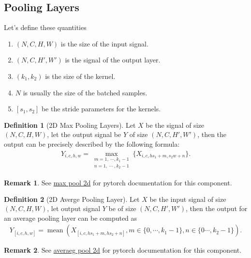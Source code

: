 \documentclass[]{article}
\theoremstyle{definition}
\newtheorem{definition}{Definition}
\newtheorem{remark}{Remark}[subsection]
{
    \newtheorem{assumption}{Assumption}
}
\numberwithin{equation}{subsection}
\begin{document}
    \subsection{Pooling Layers}
        Let's define these quantities 
        \begin{enumerate}
            \item $(N, C, H, W)$ is the size of the input signal. 
            \item $(N, C, H', W')$ is the signal of the output layer.
            \item $(k_1, k_2)$ is the size of the kernel. 
            \item $N$ is usually the size of the batched samples. 
            \item $[s_1, s_2]$ be the stride parameters for the kernels. 
        \end{enumerate}
            
        \begin{definition}[2D Max Pooling Layers]
            Let $X$ be the signal of size $(N,C, H, W)$, let the output signal be $Y$ of size $(N, C, H', W')$, then the output can be precisely described by the following formula: 
            {
            \large
            \[
                \begin{aligned}
                    Y_{i,c, h, w} = 
                    \max_{
                        \substack{m = 1, \;\cdots, k_1 - 1\\n = 1, \; \cdots \; , k_2-1}
                    }
                    \{
                        X_{i, c, hs_1 + m, s_2w + n}
                    \}. 
                \end{aligned} 
            \]
            }
        \end{definition}
        \begin{remark}
            See \href{https://pytorch.org/docs/stable/generated/torch.nn.MaxPool2d.html}{max pool 2d} for pytorch documentation for this component. 
        \end{remark}

        \begin{definition}[2D Averge Pooling Layer]
            Let $X$ be the input signal of size $(N, C, H, W)$, let output signal $Y$ be of size $(N, C, H', W')$, then the output for an average pooling layer can be computed as
            {\large
            \begin{align*}
                Y_{[i, c, h, w]} = 
                \operatorname{mean} \left(
                    X_{[i, c, hs_1 + m, hs_2 + n]}, m \in \{ 0, \cdots, k_1 -1\}, n \in \{0 \cdots, k_2 -1\}
                \right). 
            \end{align*}
            }
        \end{definition}
        \begin{remark}
            See \href{https://pytorch.org/docs/stable/generated/torch.nn.AvgPool2d.html}{averaeg pool 2d} for pytorch documentation for this component. 
        \end{remark}
\end{document}
